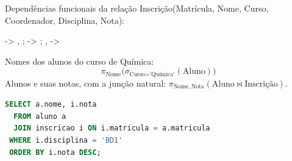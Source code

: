 \documentclass[12pt, a4paper]{article}
\begin{document}
\pagestyle{empty}

Dependências funcionais da relação
Inscrição(Matrícula, Nome, Curso, Coordenador, Disciplina, Nota):
\begin{center}
\begin{fddiagram}
   -> ,  ;
   ->  ;
  ,  -> 
\end{fddiagram}
\end{center}

Nomes dos alunos do curso de Química:
\[
  \pi_{\text{Nome}}\bigl(\sigma_{\text{Curso} = \text{'Química'}}
    (\text{Aluno})\bigr)
\]
Alunos e suas notas, com a junção natural:
\(\pi_{\text{Nome},\,\text{Nota}}(\text{Aluno} \bowtie \text{Inscrição})\).

\begin{lstlisting}[language=SQL, morekeywords={JOIN}]
SELECT a.nome, i.nota
  FROM aluno a
  JOIN inscricao i ON i.matricula = a.matricula
 WHERE i.disciplina = 'BD1'
 ORDER BY i.nota DESC;
\end{lstlisting}
\end{document}
